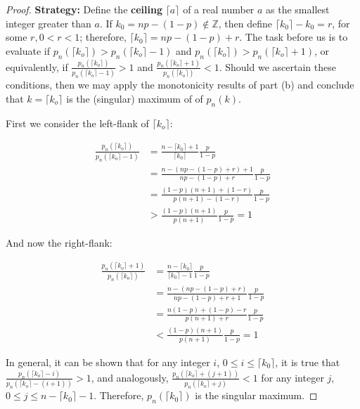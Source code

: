 \documentclass[10pt, oneside]{article}
\begin{document}
\begin{enumerate}[label=4.\arabic*]
\begin{enumerate}
	\begin{proof}\textbf{Strategy:} Define the \textbf{ceiling} $\lceil a \rceil$ of a real number $a$ as the smallest integer greater than $a$. If $k_0 = np - (1-p) \notin \mathbb{Z}$, then define $\lceil k_0 \rceil - k_0 = r$, for some $r, 0 < r < 1$; therefore, $\lceil k_0 \rceil = np - (1-p) + r$. The task before us is to evaluate if $p_n (\lceil k_o \rceil) > p_n (\lceil k_o \rceil - 1)$ and $p_n (\lceil k_o \rceil) > p_n (\lceil k_o \rceil + 1)$, or equivalently, if $\frac{p_n (\lceil k_o \rceil)}{p_n (\lceil k_o \rceil - 1)} > 1$ and $\frac{p_n (\lceil k_o \rceil + 1)}{p_n (\lceil k_o \rceil) } < 1$. Should we ascertain these conditions, then we may apply the monotonicity results of part (b) and conclude that $k = \lceil k_o \rceil$ is the (singular) maximum of of $p_n(k)$.
	
	First we consider the left-flank of $\lceil k_o \rceil$:
	
	\begin{align*}
	\frac{p_n (\lceil k_o \rceil)}{p_n (\lceil k_o \rceil - 1)} &= \frac{n - \lceil k_0 \rceil + 1}{\lceil k_0 \rceil} \frac{p}{1-p} \\
	&= \frac{n - ( np - (1-p) + r ) + 1}{np - (1-p) + r} \frac{p}{1-p} \\
	&= \frac{(1-p)(n+1) + (1-r)}{p(n+1) - (1-r)} \frac{p}{1-p} \\
	&> \frac{(1-p)(n+1)}{p(n+1)} \frac{p}{1-p} = 1
	\end{align*}
	
	And now the right-flank:
	
	\begin{align*}
	\frac{p_n (\lceil k_o \rceil + 1)}{p_n (\lceil k_o \rceil)} &= \frac{n - \lceil k_0 \rceil}{\lceil k_0 \rceil - 1} \frac{p}{1-p} \\
	&= \frac{n - (np - (1-p) + r)}{np - (1-p) + r + 1} \frac{p}{1-p} \\
	&= \frac{n (1-p) + (1-p) - r}{p(n+1) + r} \frac{p}{1-p} \\
	&< \frac{(1-p)(n+1)}{p(n+1)} \frac{p}{1-p} = 1
	\end{align*}
	
	In general, it can be shown that for any integer $i$, $0 \leq i \leq \lceil k_0 \rceil$, it is true that $\frac{p_n (\lceil k_o \rceil - i)}{p_n (\lceil k_o \rceil - (i+1))} > 1$, and analogously, $\frac{p_n (\lceil k_o \rceil + (j + 1))}{p_n (\lceil k_o \rceil + j)} < 1$ for any integer $j$, $0 \leq j \leq n - \lceil k_0 \rceil - 1$. Therefore, $p_n (\lceil k_0 \rceil)$ is the singular maximum.
	

\end{proof}
\end{enumerate}
\end{enumerate}
\end{document}
